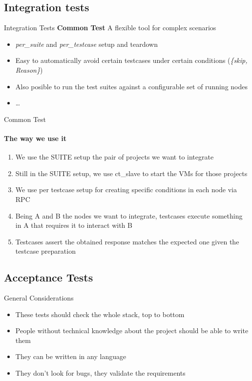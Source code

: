 \documentclass[aspectratio=169]{beamer}
\begin{document}
\subsection*{Integration tests}
\label{integration_tests}
\begin{frame}{Integration Tests}
    \textbf{Common Test} A flexible tool for complex scenarios
    \begin{itemize}
    \item \emph{per\_suite} and \emph{per\_testcase} setup and teardown
    \item Easy to automatically avoid certain testcases under certain conditions (\emph{\{skip, Reason\}})
    \item Also posible to run the test suites against a configurable set of running nodes
    \item \dots
    \end{itemize}
\end{frame}

\begin{frame}{Common Test}
    \framesubtitle {The way we use it}
    \begin{enumerate}
    \item We use the SUITE setup the pair of projects we want to integrate
    \item Still in the SUITE setup, we use ct\_slave to start the VMs for those projects
    \item We use per testcase setup for creating specific conditions in each node via RPC
    \item Being A and B the nodes we want to integrate, testcases execute something in A that requires it to interact
    with B
    \item Testcases assert the obtained response matches the expected one given the testcase preparation
    \end{enumerate}
\end{frame}

\subsection*{Acceptance Tests}
\label{acceptance_tests}

\begin{frame}{General Considerations}
    \begin{itemize}
    \item These tests should check the whole stack, top to bottom
    \item People without technical knowledge about the project should be able to write them
    \item They can be written in any language
    \item They don't look for bugs, they validate the requirements
    \end{itemize}
\end{frame}
\end{document}
